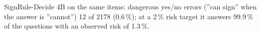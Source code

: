 SignRule-Decide 4B on the same items: dangerous yes/no errors (''can sign'' when the answer is ''cannot'') 12 of 2178 (0.6\,\%); at a 2\,\% risk target it answers 99.9\,\% of the questions with an observed risk of 1.3\,\%.
